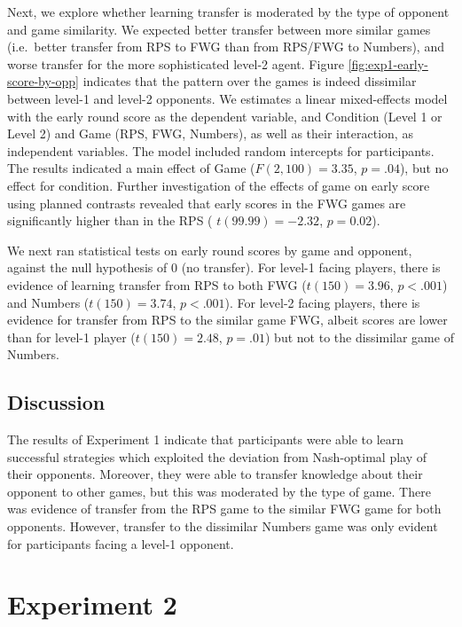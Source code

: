 \documentclass[smallextended]{svjour3}       %
\begin{document}
Next, we explore whether learning transfer is moderated by the type of
opponent and game similarity. We expected better transfer between more
similar games (i.e.~better transfer from RPS to FWG than from RPS/FWG to
Numbers), and worse transfer for the more sophisticated level-2 agent.
Figure \ref{fig:exp1-early-score-by-opp} indicates that the pattern over
the games is indeed dissimilar between level-1 and level-2 opponents. We
estimates a linear mixed-effects model with the early round score as the
dependent variable, and Condition (Level 1 or Level 2) and Game (RPS,
FWG, Numbers), as well as their interaction, as independent variables.
The model included random intercepts for participants. The results
indicated a main effect of Game (\(F(2,100) = 3.35\), \(p = .04\)), but
no effect for condition. Further investigation of the effects of game on
early score using planned contrasts revealed that early scores in the
FWG games are significantly higher than in the RPS (
\(t(99.99) = -2.32\), \(p = 0.02\)).

We next ran statistical tests on early round scores by game and
opponent, against the null hypothesis of 0 (no transfer). For level-1
facing players, there is evidence of learning transfer from RPS to both
FWG (\(t(150) = 3.96\), \(p < .001\)) and Numbers (\(t(150) = 3.74\),
\(p < .001\)). For level-2 facing players, there is evidence for
transfer from RPS to the similar game FWG, albeit scores are lower than
for level-1 player (\(t(150) = 2.48\), \(p = .01\)) but not to the
dissimilar game of Numbers.

\hypertarget{discussion}{%
\subsection{Discussion}\label{discussion}}

The results of Experiment 1 indicate that participants were able to
learn successful strategies which exploited the deviation from
Nash-optimal play of their opponents. Moreover, they were able to
transfer knowledge about their opponent to other games, but this was
moderated by the type of game. There was evidence of transfer from the
RPS game to the similar FWG game for both opponents. However, transfer
to the dissimilar Numbers game was only evident for participants facing
a level-1 opponent.

\hypertarget{experiment-2}{%
\section{Experiment 2}\label{experiment-2}}
\end{document}
